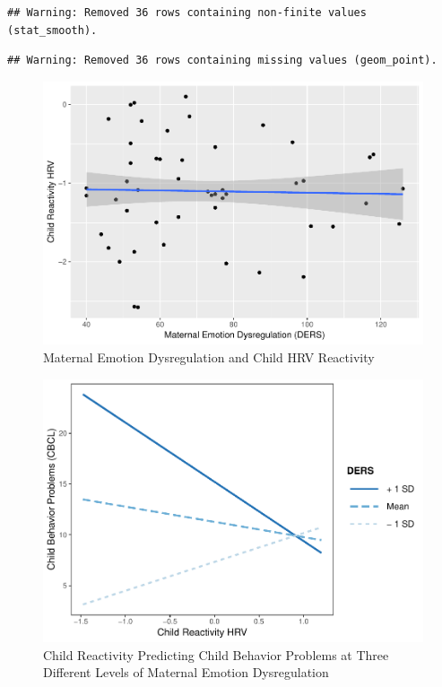 \documentclass[man]{apa6}
\begin{document}
\begin{verbatim}
## Warning: Removed 36 rows containing non-finite values (stat_smooth).
\end{verbatim}

\begin{verbatim}
## Warning: Removed 36 rows containing missing values (geom_point).
\end{verbatim}

\begin{figure}
\centering
\includegraphics{DataPrepScript_apa_style_files/figure-latex/plot2-1.pdf}
\caption{\label{fig:plot2}Maternal Emotion Dysregulation and Child HRV
Reactivity}
\end{figure}

\begin{figure}
\centering
\includegraphics{DataPrepScript_apa_style_files/figure-latex/plot3-1.pdf}
\caption{\label{fig:plot3}Child Reactivity Predicting Child Behavior
Problems at Three Different Levels of Maternal Emotion Dysregulation}
\end{figure}
\end{document}
